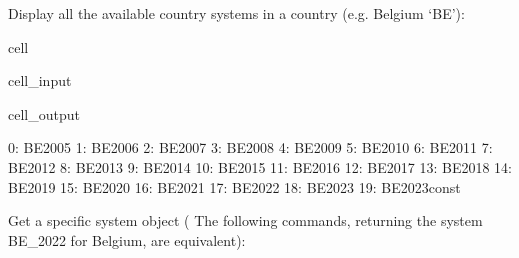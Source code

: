 \documentclass[letterpaper,10pt,english]{sphinxmanual}
\begin{document}
\sphinxAtStartPar
Display all the available country systems in a country (e.g. Belgium ‘BE’):

\begin{sphinxuseclass}{cell}
\begin{sphinxuseclass}{cell_input}
\begin{sphinxVerbatim}[commandchars=\\\{\}]
\PYG{p}{[}\PYG{p}{]}
\end{sphinxVerbatim}

\end{sphinxuseclass}
\begin{sphinxuseclass}{cell_output}
\begin{sphinxVerbatim}[commandchars=\\\{\}]
0: BE\PYGZus{}2005       
1: BE\PYGZus{}2006       
2: BE\PYGZus{}2007       
3: BE\PYGZus{}2008       
4: BE\PYGZus{}2009       
5: BE\PYGZus{}2010       
6: BE\PYGZus{}2011       
7: BE\PYGZus{}2012       
8: BE\PYGZus{}2013       
9: BE\PYGZus{}2014       
10: BE\PYGZus{}2015      
11: BE\PYGZus{}2016      
12: BE\PYGZus{}2017      
13: BE\PYGZus{}2018      
14: BE\PYGZus{}2019      
15: BE\PYGZus{}2020      
16: BE\PYGZus{}2021      
17: BE\PYGZus{}2022      
18: BE\PYGZus{}2023      
19: BE\PYGZus{}2023\PYGZus{}const
\end{sphinxVerbatim}

\end{sphinxuseclass}
\end{sphinxuseclass}
\sphinxAtStartPar
Get a specific system object ( The following commands, returning the system BE\_2022 for Belgium, are equivalent):
\end{document}

